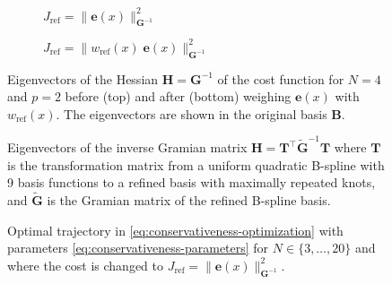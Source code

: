 \begin{figure}
    \begin{subfigure}{\textwidth}
        \centering
        
        \caption{$J_\text{ref} = \|\mathbf e(x)\|_{\mathbf G^{-1}}^2$}
        \label{fig:conservativeness-eigenvectors-inv-gramian}
    \end{subfigure}
    \begin{subfigure}{\textwidth}
        \centering
        
        \caption{$J_\text{ref} = \|w_\text{ref}(x)\;\mathbf e(x)\|_{\mathbf G^{-1}}^2$}
        \label{fig:conservativeness-eigenvectors-weight-inv-gramian}
    \end{subfigure}
    \caption{Eigenvectors of the Hessian $\mathbf H = \mathbf G^{-1}$ of the cost function for $N=4$ and $p=2$ before (top) and after (bottom) weighing $\mathbf e(x)$ with $w_\text{ref}(x)$. The eigenvectors are shown in the original basis $\mathbf B$.}
    \label{fig:conservativeness-eigenvectors-inv-gramian-full}
\end{figure}

\begin{figure}
    \centering
    
    \caption{Eigenvectors of the inverse Gramian matrix $\mathbf H = \mathbf T^\top \mathbf{\tilde G}^{-1} \mathbf T$ where $\mathbf T$ is the transformation matrix from a uniform quadratic B-spline with 9 basis functions to a refined basis with maximally repeated knots, and $\mathbf{\tilde G}$ is the Gramian matrix of the refined B-spline basis.}
    \label{fig:refined-basis-inverse-gramian-eigenvectors-9}
\end{figure}

\begin{figure}
    \centering
    
    \caption{Optimal trajectory in \cref{eq:conservativeness-optimization} with parameters \cref{eq:conservativeness-parameters} for $N\in\{3,\ldots,20\}$ and where the cost is changed to $J_\text{ref} = \|\mathbf e(x)\|_{\mathbf G^{-1}}^2$.}
    \label{fig:conservativeness-traj-inv-gramian}
\end{figure}



